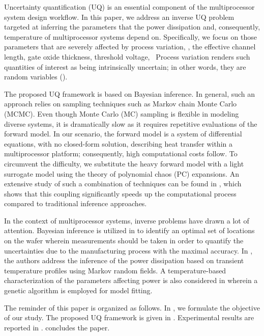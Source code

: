 Uncertainty quantification (UQ) is an essential component of the multiprocessor system design workflow. In this paper, we address an inverse UQ problem targeted at inferring the parameters that the power dissipation and, consequently, temperature of multiprocessor systems depend on. Specifically, we focus on those parameters that are severely affected by process variation, \eg, the effective channel length, gate oxide thickness, threshold voltage, \etc\ Process variation renders such quantities of interest as being intrinsically uncertain; in other words, they are random variables (\rvs).

The proposed UQ framework is based on Bayesian inference. In general, such an approach relies on sampling techniques such as Markov chain Monte Carlo (MCMC). Even though Monte Carlo (MC) sampling is flexible in modeling diverse systems, it is dramatically slow as it requires repetitive evaluations of the forward model. In our scenario, the forward model is a system of differential equations, with no closed-form solution, describing heat transfer within a multiprocessor platform; consequently, high computational costs follow. To circumvent the difficulty, we substitute the heavy forward model with a light surrogate model using the theory of polynomial chaos (PC) expansions. An extensive study of such a combination of techniques can be found in \cite{marzouk2007, el-moselhy2012}, which shows that this coupling significantly speeds up the computational process compared to traditional inference approaches.

In the context of multiprocessor systems, inverse problems have drawn a lot of attention. Bayesian inference is utilized in \cite{zhang2010} to identify an optimal set of locations on the wafer wherein measurements should be taken in order to quantify the uncertainties due to the manufacturing process with the maximal accuracy. In \cite{paek2012}, the authors address the inference of the power dissipation based on transient temperature profiles using Markov random fields. A temperature-based characterization of the parameters affecting power is also considered in \cite{mesa-martinez2007} wherein a genetic algorithm is employed for model fitting.

The reminder of this paper is organized as follows. In , we formulate the objective of our study. The proposed UQ framework is given in . Experimental results are reported in .  concludes the paper.

